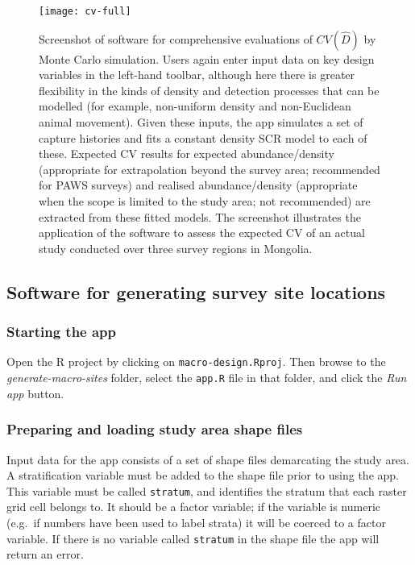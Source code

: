 \documentclass[a4paper,11pt, draft]{article} %
\begin{document}
\begin{figure}[htbp]
\centering
\texttt{[image: cv-full]}
\caption{Screenshot of software for comprehensive evaluations of $CV(\hat{D})$ by Monte Carlo simulation. Users again enter input data on key design variables in the left-hand toolbar, although here there is greater flexibility in the kinds of density and detection processes that can be modelled (for example, non-uniform density and non-Euclidean animal movement). Given these inputs, the app simulates a set of capture histories and fits a constant density SCR model to each of these. Expected CV results for expected abundance/density (appropriate for extrapolation beyond the survey area; recommended for PAWS surveys) and realised abundance/density (appropriate when the scope is limited to the study area; not recommended) are extracted from these fitted models. The screenshot illustrates the application of the software to assess the expected CV of an actual study conducted over three survey regions in Mongolia.}
\label{cva-1}
\end{figure} 

\subsection{Software for generating survey site locations}

\subsubsection{Starting the app}
Open the R project by clicking on \texttt{macro-design.Rproj}. Then browse to the \textit{generate-macro-sites} folder, select the \texttt{app.R} file in that folder, and click the \textit{Run app} button. 

\subsubsection{Preparing and loading study area shape files}
Input data for the app consists of a set of shape files demarcating the study area. A stratification variable must be added to the shape file prior to using the app. This variable must be called \texttt{stratum}, and identifies the stratum that each raster grid cell belongs to. It should be a factor variable; if the variable is numeric (e.g.\ if numbers have been used to label strata) it will be coerced to a factor variable. If there is no variable called \texttt{stratum} in the shape file the app will return an error.
\end{document}
